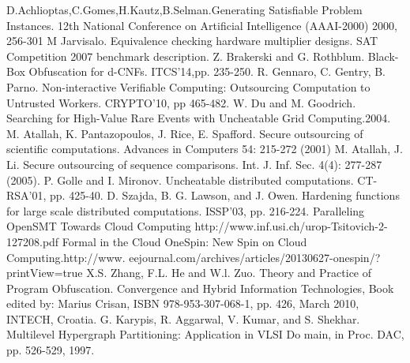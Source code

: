 \documentclass[conference]{IEEEtran}
\begin{document}
\begin{thebibliography}{26}
D.Achlioptas,C.Gomes,H.Kautz,B.Selman.Generating Satisfiable Problem Instances.
 12th National Conference on Artificial Intelligence (AAAI-2000) 2000, 256-301
M Jarvisalo. Equivalence checking hardware multiplier designs.
SAT Competition 2007 benchmark description.
Z. Brakerski and G. Rothblum.
Black-Box Obfuscation for d-CNFs.
ITCS'14,pp. 235-250.
R. Gennaro, C. Gentry, B. Parno.
Non-interactive Verifiable Computing: Outsourcing Computation to Untrusted Workers.
CRYPTO'10, pp 465-482.
W. Du and M. Goodrich.
Searching for High-Value Rare Events with Uncheatable Grid Computing.2004.
M. Atallah, K. Pantazopoulos, J. Rice, E. Spafford.
Secure outsourcing of scientific computations.
Advances in Computers 54: 215-272 (2001)
M. Atallah, J. Li.
Secure outsourcing of sequence comparisons.
Int. J. Inf. Sec. 4(4): 277-287 (2005).
P. Golle and I. Mironov.
Uncheatable distributed computations.
CT-RSA'01, pp. 425-40.
D. Szajda, B. G. Lawson, and J. Owen.
Hardening functions for large scale distributed computations.
ISSP'03, pp. 216-224.
Paralleling OpenSMT Towards Cloud Computing http://www.inf.usi.ch/urop-Tsitovich-2-127208.pdf
Formal in the Cloud OneSpin: New Spin on Cloud Computing.http://www. eejournal.com/archives/articles/20130627-onespin/?printView=true
X.S. Zhang, F.L. He and W.l. Zuo. Theory and Practice of Program Obfuscation.
Convergence and Hybrid Information Technologies, Book edited by: Marius Crisan, ISBN 978-953-307-068-1, pp. 426, March 2010, INTECH, Croatia.
 G. Karypis, R. Aggarwal, V. Kumar, and S. Shekhar.
Multilevel Hypergraph Partitioning: Application in VLSI Do main, in Proc. DAC, pp. 526-529, 1997.

\end{thebibliography}




\end{document}
